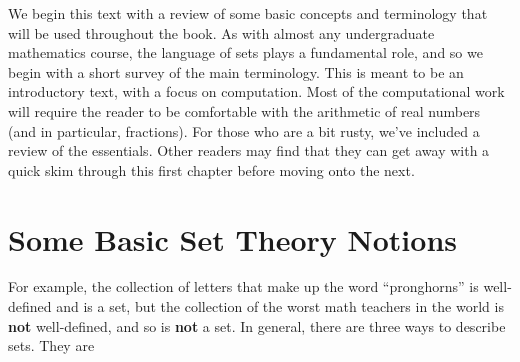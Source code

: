 We begin this text with a review of some basic concepts and terminology that will be used throughout the book. As with almost any undergraduate mathematics course, the language of sets plays a fundamental role, and so we begin with a short survey of the main terminology. This is meant to be an introductory text, with a focus on computation. Most of the computational work will require the reader to be comfortable with the arithmetic of real numbers (and in particular, fractions). For those who are a bit rusty, we've included a review of the essentials. Other readers may find that they can get away with a quick skim through this first chapter before moving onto the next.

\section{Some Basic Set Theory Notions}
\label{SetTheory}





\smallskip

For example, the collection of letters that make up the word ``pronghorns'' is well-defined and is a set, but  the collection of the worst math teachers in the world is \textbf{not} well-defined, and so is \textbf{not} a set.  In general, there are three ways to describe sets.  They are


\smallskip

\smallskip

